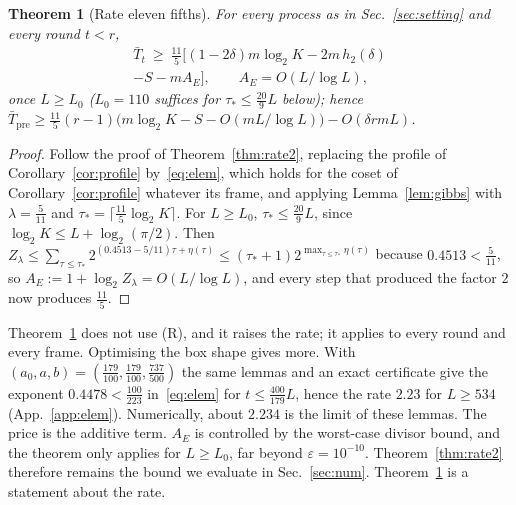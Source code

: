 \documentclass[aps,prx,twocolumn,superscriptaddress,nofootinbib,longbibliography]{revtex4-2}
\theoremstyle{plain}
\newtheorem{theorem}{Theorem}
\theoremstyle{definition}
\theoremstyle{remark}
\newcommand{\Tpre}{T_{\mathrm{pre}}}
\begin{document}
\begin{theorem}[Rate eleven fifths]\label{thm:rate115}
For every process as in Sec.~\ref{sec:setting} and every round $t<r$,
\begin{multline}\label{eq:rate115}
\bar T_t\ \ge\ \tfrac{11}5\big[(1-2\delta)m\log_2K-2m\,h_2(\delta)\\-S-mA_E\big],\qquad A_E=O(L/\log L),
\end{multline}
once $L\ge L_0$ ($L_0=110$ suffices for $\tau_*\le\tfrac{20}9L$ below); hence $\bar\Tpre\ge\tfrac{11}5(r-1)\big(m\log_2K-S-O(mL/\log L)\big)-O(\delta rmL)$.
\end{theorem}
\begin{proof}
Follow the proof of Theorem~\ref{thm:rate2}, replacing the profile of Corollary~\ref{cor:profile} by~\eqref{eq:elem}, which holds for the coset of Corollary~\ref{cor:profile} whatever its frame, and applying Lemma~\ref{lem:gibbs} with $\lambda=\tfrac5{11}$ and $\tau_*=\lceil\tfrac{11}5\log_2K\rceil$. For $L\ge L_0$, $\tau_*\le\tfrac{20}9L$, since $\log_2K\le L+\log_2(\pi/2)$. Then $Z_\lambda\le\sum_{\tau\le\tau_*}2^{(0.4513-5/11)\tau+\eta(\tau)}\le(\tau_*+1)2^{\max_{\tau\le\tau_*}\eta(\tau)}$ because $0.4513<\tfrac5{11}$, so $A_E:=1+\log_2Z_\lambda=O(L/\log L)$, and every step that produced the factor $2$ now produces $\tfrac{11}5$.
\end{proof}
Theorem~\ref{thm:rate115} does not use (R), and it raises the rate; it applies to every round and every frame. Optimising the box shape gives more. With $(a_0,a,b)=(\tfrac{179}{100},\tfrac{179}{100},\tfrac{737}{500})$ the same lemmas and an exact certificate give the exponent $0.4478<\tfrac{100}{223}$ in~\eqref{eq:elem} for $t\le\tfrac{400}{179}L$, hence the rate $2.23$ for $L\ge534$ (App.~\ref{app:elem}). Numerically, about $2.234$ is the limit of these lemmas. The price is the additive term. $A_E$ is controlled by the worst-case divisor bound, and the theorem only applies for $L\ge L_0$, far beyond $\varepsilon=10^{-10}$. Theorem~\ref{thm:rate2} therefore remains the bound we evaluate in Sec.~\ref{sec:num}. Theorem~\ref{thm:rate115} is a statement about the rate.
\end{document}
